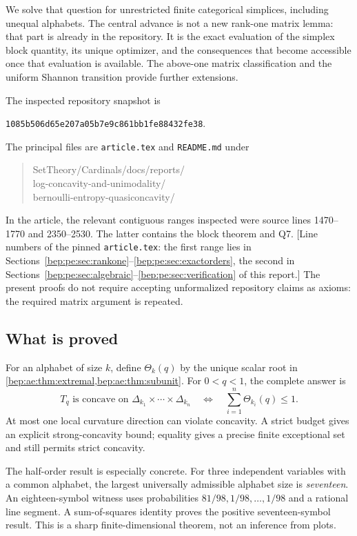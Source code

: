 \documentclass[11pt]{article}
\numberwithin{equation}{section}
\theoremstyle{definition}
\theoremstyle{remark}
\newcommand{\code}[1]{\texttt{\small #1}}
\begin{document}
We solve that question for unrestricted finite categorical simplices,
including unequal alphabets. The central advance is not a new rank-one
matrix lemma: that part is already in the repository. It is the exact
evaluation of the simplex block quantity, its unique optimizer, and the
consequences that become accessible once that evaluation is available.
The above-one matrix classification and the uniform Shannon transition
provide further extensions.

The inspected repository snapshot is
\begin{center}\small\texttt{1085b506d65e207a05b7e9c861bb1fe88432fe38}.\end{center}
The principal files are \code{article.tex} and \code{README.md} under
\begin{quote}\small\ttfamily
SetTheory/Cardinals/docs/reports/\\
log-concavity-and-unimodality/\\
bernoulli-entropy-quasiconcavity/
\end{quote}
In the article, the relevant contiguous ranges inspected were source
lines 1470--1770 and 2350--2530. The latter contains the block theorem
and Q7. [Line numbers of the pinned \code{article.tex}: the first range
lies in Sections~\ref{bep:pe:sec:rankone}--\ref{bep:pe:sec:exactorders},
the second in Sections~\ref{bep:pe:sec:algebraic}--\ref{bep:pe:sec:verification}
of this report.] The present proofs do not require accepting unformalized
repository claims as axioms: the required matrix argument is repeated.

\subsection{What is proved}
For an alphabet of size $k$, define $\Theta_k(q)$ by the unique scalar
root in \cref{bep:ae:thm:extremal,bep:ae:thm:subunit}. For $0<q<1$, the complete answer is
\begin{equation}\label{bep:ae:eq:introcriterion}
 T_q\text{ is concave on }\Delta_{k_1}\times\cdots\times\Delta_{k_n}
 \quad\Longleftrightarrow\quad
 \sum_{i=1}^n\Theta_{k_i}(q)\leq1.
\end{equation}
At most one local curvature direction can violate concavity. A strict
budget gives an explicit strong-concavity bound; equality gives a precise
finite exceptional set and still permits strict concavity.

The half-order result is especially concrete. For three independent
variables with a common alphabet, the largest universally admissible
alphabet size is \emph{seventeen}. An eighteen-symbol witness uses
probabilities $81/98,1/98,\ldots,1/98$ and a rational line segment. A
sum-of-squares identity proves the positive seventeen-symbol result.
This is a sharp finite-dimensional theorem, not an inference from plots.
\end{document}
